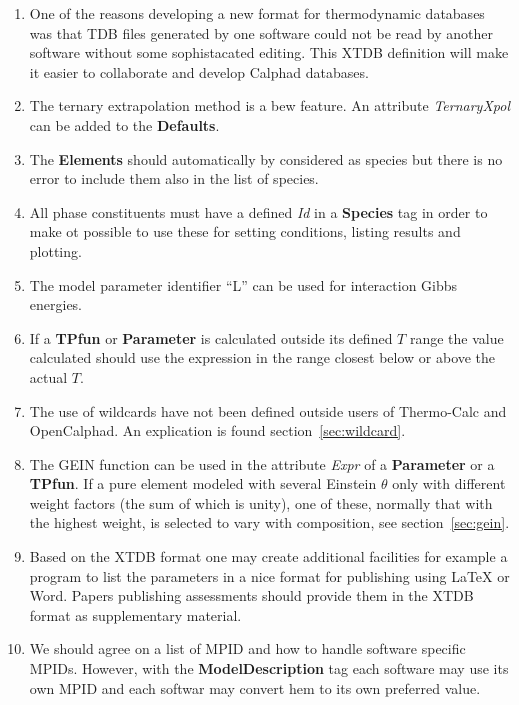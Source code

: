 \documentclass{article}
\begin{document}
\begin{enumerate}
\item One of the reasons developing a new format for thermodynamic
  databases was that TDB files generated by one software could not be
  read by another software without some sophistacated editing.  
  This XTDB definition will make it easier to collaborate and
  develop Calphad databases.

\item The ternary extrapolation method is a bew feature.  An attribute
  {\em TernaryXpol} can be added to the {\bf Defaults}.

\item The {\bf Elements} should automatically by considered as species but
  there is no error to include them also in the list of species.

\item All phase constituents must have a defined {\em Id} in a {\bf
  Species} tag in order to make ot possible to use these for setting
  conditions, listing results and plotting.

\item The model parameter identifier ``L'' can be used for interaction
  Gibbs energies.

\item If a {\bf TPfun} or {\bf Parameter} is calculated outside its
  defined $T$ range the value calculated should use the
  expression in the range closest below or above the actual $T$. 

\item The use of wildcards have not been defined outside users of
  Thermo-Calc and OpenCalphad.  An explication is found
  section~\ref{sec:wildcard}.

\item The GEIN function can be used in the attribute {\em Expr} of a
  {\bf Parameter} or a {\bf TPfun}.  If a pure element modeled with
  several Einstein $\theta$ only with different weight factors (the
  sum of which is unity), one of these, normally that with the highest
  weight, is selected to vary with composition, see
  section~\ref{sec:gein}.

\item Based on the XTDB format one may create additional facilities
  for example a program to list the parameters in a nice format for
  publishing using LaTeX or Word.  Papers publishing assessments
  should provide them in the XTDB format as supplementary material.

\item We should agree on a list of MPID and how to handle software
  specific MPIDs.  However, with the {\bf ModelDescription} tag each
  software may use its own MPID and each softwar may convert hem
  to its own preferred value.


\end{enumerate}
\end{document}

